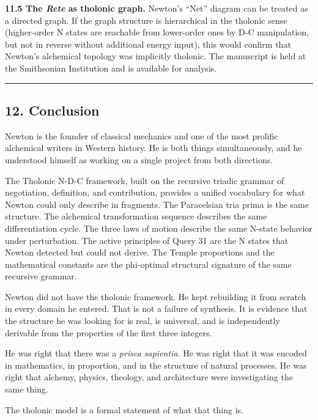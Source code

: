 \documentclass[
  11pt,
  letterpaper,
]{article}
\begin{document}
\textbf{11.5 The \emph{Rete} as tholonic graph.} Newton's ``Net''
diagram can be treated as a directed graph. If the graph structure is
hierarchical in the tholonic sense (higher-order N states are reachable
from lower-order ones by D-C manipulation, but not in reverse without
additional energy input), this would confirm that Newton's alchemical
topology was implicitly tholonic. The manuscript is held at the
Smithsonian Institution and is available for analysis.

\begin{center}\rule{0.5\linewidth}{0.5pt}\end{center}

\subsection{12. Conclusion}\label{conclusion}

Newton is the founder of classical mechanics and one of the most
prolific alchemical writers in Western history. He is both things
simultaneously, and he understood himself as working on a single project
from both directions.

The Tholonic N-D-C framework, built on the recursive triadic grammar of
negotiation, definition, and contribution, provides a unified vocabulary
for what Newton could only describe in fragments. The Paracelsian tria
prima is the same structure. The alchemical transformation sequence
describes the same differentiation cycle. The three laws of motion
describe the same N-state behavior under perturbation. The active
principles of Query 31 are the N states that Newton detected but could
not derive. The Temple proportions and the mathematical constants are
the phi-optimal structural signature of the same recursive grammar.

Newton did not have the tholonic framework. He kept rebuilding it from
scratch in every domain he entered. That is not a failure of synthesis.
It is evidence that the structure he was looking for is real, is
universal, and is independently derivable from the properties of the
first three integers.

He was right that there was a \emph{prisca sapientia}. He was right that
it was encoded in mathematics, in proportion, and in the structure of
natural processes. He was right that alchemy, physics, theology, and
architecture were investigating the same thing.

The tholonic model is a formal statement of what that thing is.
\end{document}
